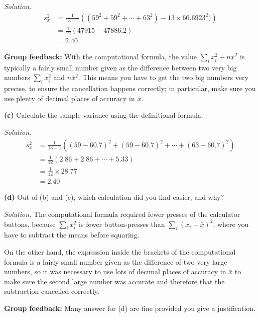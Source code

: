 \documentclass[
  a4paper,
]{book}
\theoremstyle{definition}
\theoremstyle{definition}
\theoremstyle{definition}
\theoremstyle{definition}
\theoremstyle{remark}
\begin{document}
\begin{myanswers}
\emph{Solution.}
\begin{align*}
s_x^2 &= \frac{1}{13 - 1} \left( (59^2 + 59^2 + \cdots + 63^2) - 13 \times 60.6923^2)\right) \\
      &= \frac{1}{12} (47915 - 47886.2) \\
      &= 2.40
\end{align*}

\textbf{Group feedback:} With the computational formula, the value \(\sum_i x_i^2 - n \bar{x}^2\) is typically a fairly small number given as the difference between two very big numbers \(\sum_i x_i^2\) and \(n \bar x^2\). This means you have to get the two big numbers very precise, to ensure the cancellation happens correctly; in particular, make sure you use plenty of decimal places of accuracy in \(\bar x\).

\end{myanswers}

\textbf{(c)} Calculate the sample variance using the definitional
formula.

\begin{myanswers}
\emph{Solution.}
\begin{align*}
s_x^2 &= \frac{1}{13 - 1} \left( (59 - 60.7)^2 + (59 - 60.7)^2 + \cdots + (63 - 60.7)^2 \right) \\
      &= \frac{1}{12} (2.86 + 2.86 + \cdots + 5.33) \\
      &= \frac{1}{12} \times 28.77 \\
      &= 2.40
\end{align*}

\end{myanswers}

\textbf{(d)} Out of (b) and (c), which calculation did you find easier, and why?

\begin{myanswers}
\emph{Solution.} The computational formula required fewer presses of the calculator buttons, because \(\sum_i x_i^2\) is fewer button-presses than \(\sum_i (x_i - \bar x)^2\), where you have to subtract the means before squaring.

On the other hand, the expression inside the brackets of the computational formula is a fairly small number given as the difference of two very large numbers, so it was necessary to use lots of decimal places of accuracy in \(\bar x\) to make sure the second large number was accurate and therefore that the subtraction cancelled correctly.

\textbf{Group feedback:} Many answer for (d) are fine provided you give a justification.

\end{myanswers}
\end{document}
